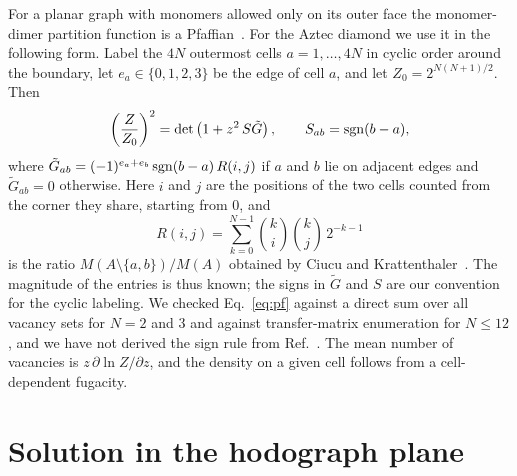 \documentclass[reprint,aps,pre,superscriptaddress,longbibliography,floatfix,amsmath,amssymb]{revtex4-2}
\begin{document}
For a planar graph with monomers allowed only on its outer face the monomer-dimer partition function is a Pfaffian~\cite{giuliani2016}. For the Aztec diamond we use it in the following form. Label the $4N$ outermost cells $a=1,\dots,4N$ in cyclic order around the boundary, let $e_a\in\{0,1,2,3\}$ be the edge of cell $a$, and let $Z_0=2^{N(N+1)/2}$. Then
\begin{equation}\label{eq:pf}
  \left(\frac{Z}{Z_0}\right)^{2}=\det\left(1+z^2\,S\tilde G\right),\qquad S_{ab}={\rm sgn}(b-a),
\end{equation}
where $\tilde G_{ab}=(-1)^{e_a+e_b}\,{\rm sgn}(b-a)\,R(i,j)$ if $a$ and $b$ lie on adjacent edges and $\tilde G_{ab}=0$ otherwise. Here $i$ and $j$ are the positions of the two cells counted from the corner they share, starting from $0$, and
\begin{equation}
  R(i,j)=\sum_{k=0}^{N-1}\binom{k}{i}\binom{k}{j}\,2^{-k-1}
\end{equation}
is the ratio $M(A\setminus\{a,b\})/M(A)$ obtained by Ciucu and Krattenthaler~\cite{ciucu2023}. The magnitude of the entries is thus known; the signs in $\tilde G$ and $S$ are our convention for the cyclic labeling. We checked Eq.~\eqref{eq:pf} against a direct sum over all vacancy sets for $N=2$ and $3$ and against transfer-matrix enumeration for $N\le12$, and we have not derived the sign rule from Ref.~\cite{giuliani2016}. The mean number of vacancies is $z\,\partial\ln Z/\partial z$, and the density on a given cell follows from a cell-dependent fugacity.

\section{Solution in the hodograph plane}\label{app:rh}
\end{document}

